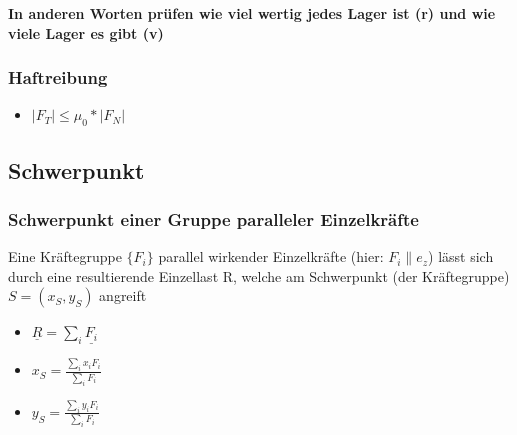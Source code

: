 \documentclass[11pt]{article}
\begin{document}
\textbf{In anderen Worten prüfen wie viel wertig jedes Lager ist (r) und wie viele Lager es gibt (v)}

\subsubsection{Haftreibung}
\label{sec:org00a7ce2}
\begin{itemize}
\item \(|F_T| \leq \mu_0 * |F_N|\)
\end{itemize}

\subsection{Schwerpunkt}
\label{sec:org7afca80}
\subsubsection{Schwerpunkt einer Gruppe paralleler Einzelkräfte}
\label{sec:orge6031f1}
Eine Kräftegruppe \(\{F_i\}\) parallel wirkender Einzelkräfte (hier: \(F_i ∥ e_z\)) lässt sich durch eine
resultierende Einzellast R, welche am Schwerpunkt (der Kräftegruppe) \(S = (x_S, y_S)\) angreift
\begin{itemize}
\item \(\underline{R} = \sum_i \underline{F_i}\)
\item \(x_S = \frac{\sum_i x_i F_i}{\sum_i F_i}\)
\item \(y_S = \frac{\sum_i y_i F_i}{\sum_i F_i}\)
\end{itemize}
\end{document}
